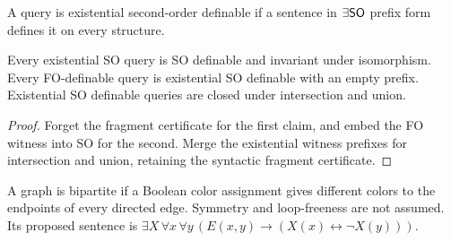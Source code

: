 \begin{definition}
  \label{def:desc-exist-so-definable}
  \leanok
  A query is existential second-order definable if a sentence in
  $\exists\mathsf{SO}$ prefix form defines it on every structure.
\end{definition}

\begin{theorem}
  \label{thm:desc-exist-so-definable}
  \leanok
  Every existential SO query is SO definable and invariant under isomorphism.
  Every FO-definable query is existential SO definable with an empty prefix.
  Existential SO definable queries are closed under intersection and union.
\end{theorem}
\begin{proof}
  \leanok
  Forget the fragment certificate for the first claim, and embed the FO witness
  into SO for the second. Merge the existential witness prefixes for intersection
  and union, retaining the syntactic fragment certificate.
\end{proof}

\begin{definition}
  \label{def:desc-bipartite}
  \leanok
  A graph is bipartite if a Boolean color assignment gives different colors to
  the endpoints of every directed edge. Symmetry and loop-freeness are not
  assumed. Its proposed sentence is
  $\exists X\,\forall x\,\forall y\,
  (E(x,y)\to(X(x)\leftrightarrow\neg X(y)))$.
\end{definition}

